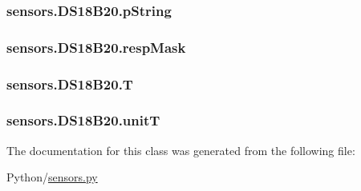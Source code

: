 \subsubsection[{\texorpdfstring{p\+String}{pString}}]{\setlength{\rightskip}{0pt plus 5cm}sensors.\+D\+S18\+B20.\+p\+String}\hypertarget{classsensors_1_1DS18B20_a9edc6c09ffba98f42e5b7cad1685d564}{}\label{classsensors_1_1DS18B20_a9edc6c09ffba98f42e5b7cad1685d564}
\subsubsection[{\texorpdfstring{resp\+Mask}{respMask}}]{\setlength{\rightskip}{0pt plus 5cm}sensors.\+D\+S18\+B20.\+resp\+Mask}\hypertarget{classsensors_1_1DS18B20_ac064c221c0d23deb28ec74e3e9bb6510}{}\label{classsensors_1_1DS18B20_ac064c221c0d23deb28ec74e3e9bb6510}
\subsubsection[{\texorpdfstring{T}{T}}]{\setlength{\rightskip}{0pt plus 5cm}sensors.\+D\+S18\+B20.\+T}\hypertarget{classsensors_1_1DS18B20_a738644d266b4149bdd79e1a269e555ad}{}\label{classsensors_1_1DS18B20_a738644d266b4149bdd79e1a269e555ad}
\subsubsection[{\texorpdfstring{unitT}{unitT}}]{\setlength{\rightskip}{0pt plus 5cm}sensors.\+D\+S18\+B20.\+unitT}\hypertarget{classsensors_1_1DS18B20_a2a93fcbbf67debf4356c6c3a9b2b58f3}{}\label{classsensors_1_1DS18B20_a2a93fcbbf67debf4356c6c3a9b2b58f3}


The documentation for this class was generated from the following file\+:\begin{DoxyCompactItemize}
\item 
Python/\hyperlink{sensors_8py}{sensors.\+py}\end{DoxyCompactItemize}

